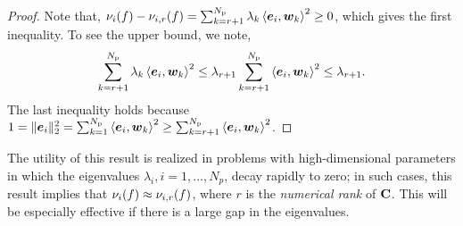 \begin{proof} 


Note that, $\nu_i(f) - \act{f}{i}{r}= \sum_{k=r+1}^\Np \lambda_k \ip{\vec{e}_i}{\vec{w}_k}^2 \geq 0$,
which gives the first inequality. To see the upper bound, we note,
\[
   \sum_{k=r+1}^\Np \lambda_k \ip{\vec{e}_i}{\vec{w}_k}^2 \leq \lambda_{r+1} \sum_{k=r+1}^\Np \ip{\vec{e}_i}{\vec{w}_k}^2
   \leq \lambda_{r+1}. 
\]
The last inequality holds because 
$1 = \|\vec{e}_i\|_2^2 = 
\sum_{k = 1}^\Np \ip{\vec{e}_i}{\vec{w}_k}^2 
\geq \sum_{k=r+1}^\Np \ip{\vec{e}_i}{\vec{w}_k}^2$.
\end{proof} 
The utility of this result is realized in problems with 
high-dimensional parameters in which 
the eigenvalues $\lambda_i, i=1,\ldots,N_p$, decay rapidly to zero; in 
such cases, this result implies that  $\nu_i(f) \approx \act{f}{i}{r}$,
where $r$ is the \emph{numerical rank} of $\mat{C}$.  This will be especially
effective if there is a large gap in the eigenvalues.  

